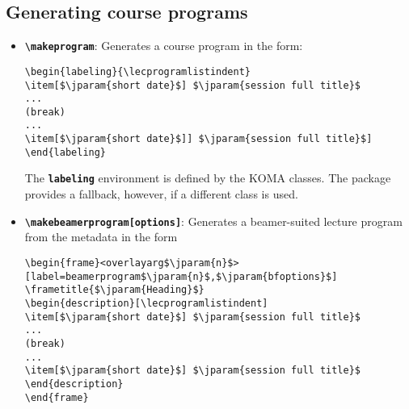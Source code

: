 \documentclass[english]{article}
\newcommand*\jmacro[1]{\textbf{\texttt{#1}}}
\newcommand*\jcsmacro[1]{\jmacro{\textbackslash{#1}}}
\newcommand*\jparam[1]{\angus #1\angud}
\begin{document}
\subsection{Generating course programs}
\label{sec:lecprog}
\begin{itemize}
\item \jcsmacro{makeprogram}: Generates a course program in the form:
\begin{lstlisting}[language={[LaTeX]TeX},basicstyle={\small\ttfamily},
                   frame=single,escapechar=\$]
\begin{labeling}{\lecprogramlistindent}
\item[$\jparam{short date}$] $\jparam{session full title}$
...
(break)
...
\item[$\jparam{short date}$]] $\jparam{session full title}$]
\end{labeling}
\end{lstlisting}

The \jmacro{labeling} environment is defined by the KOMA classes.
The package provides a fallback, however, if a different class is used.

\item \jcsmacro{makebeamerprogram[\jparam{options}]}: Generates
a beamer-suited lecture program from the metadata in the form
\begin{lstlisting}[language={[LaTeX]TeX},basicstyle={\small\ttfamily},
                   frame=single,escapechar=\$,moretexcs={[1]{frametitle}}]
\begin{frame}<overlayarg$\jparam{n}$>[label=beamerprogram$\jparam{n}$,$\jparam{bfoptions}$]
\frametitle{$\jparam{Heading}$}
\begin{description}[\lecprogramlistindent]
\item[$\jparam{short date}$] $\jparam{session full title}$
...
(break)
...
\item[$\jparam{short date}$] $\jparam{session full title}$
\end{description}
\end{frame}
\end{lstlisting}


\end{itemize}
\end{document}
